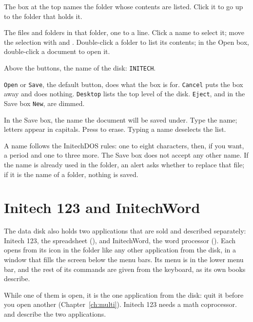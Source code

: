 The box at the top names the folder whose contents
are listed.  Click it to go up to the folder that holds it.

The files and folders in that folder, one to a line.  Click
a name to select it; move the selection with  and .  Double-click a folder to list its contents; in the Open box,
double-click a document to open it.

Above the buttons, the name of the disk:
\texttt{INITECH}.

\texttt{Open} or \texttt{Save}, the default button, does
what the box is for.  \texttt{Cancel} puts the box away and does nothing.
\texttt{Desktop} lists the top level of the disk.  \texttt{Eject}, and in
the Save box \texttt{New}, are dimmed.

In the Save box, the name the document will be saved
under.  Type the name; letters appear in capitals.  Press 
to erase.  Typing a name deselects the list.

A name follows the InitechDOS rules: one to eight characters, then, if
you want, a period and one to three more.  The Save box does not accept
any other name.  If the name is already used in the folder, an alert asks
whether to replace that file; if it is the name of a folder, nothing is
saved.

\section{Initech 123 and InitechWord}
The data disk also holds two applications that are sold and described
separately: Initech 123, the spreadsheet (), and InitechWord,
the word processor ().  Each opens from its icon in the
 folder like any other application from the disk, in a window
that fills the screen below the menu bars.  Its  menu is in
the lower menu bar, and the rest of its commands are given from the
keyboard, as its own books describe.



While one of them is open, it is the one application from the disk: quit it
before you open another (Chapter~\ref{ch:multi}).  Initech 123 needs a
math coprocessor.   and
 describe the two applications.

